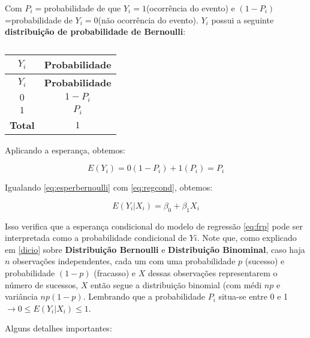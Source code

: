 \documentclass[
]{book}
\begin{document}
Com \(P_i=\)probabilidade de que \(Y_i=1\)(ocorrência do evento) e \((1-P_i)\)=probabilidade de \(Y_i=0\)(não ocorrência do evento). \(Y_i\) possui a seguinte \textbf{distribuição de probabilidade de Bernoulli}:

\begin{longtable}[]{@{}cc@{}}
\caption{\label{tab:bernoulireg}}\tabularnewline
\toprule
\textbf{\(Y_i\)} & \textbf{Probabilidade}\tabularnewline
\midrule
\endfirsthead
\toprule
\textbf{\(Y_i\)} & \textbf{Probabilidade}\tabularnewline
\midrule
\endhead
\(0\) & \(1-P_i\)\tabularnewline
\(1\) & \(P_i\)\tabularnewline
\textbf{Total} & \(1\)\tabularnewline
\bottomrule
\end{longtable}

Aplicando a esperança, obtemos:

\begin{equation}
    E(Y_i)=0(1-P_i)+1(P_i)=P_i
    \label{eq:esperbernoulli}
\end{equation}

Igualando \eqref{eq:esperbernoulli} com \eqref{eq:regcond}, obtemos:

\begin{equation}
    E(Y_i|X_i)=\beta_0+\beta_1 X_i
    \label{eq:regprob}
\end{equation}

Isso verifica que a esperança condicional do modelo de regressão \eqref{eq:frp} pode ser interpretada como a probabilidade
condicional de \(Yi\). Note que, como explicado em \ref{dicio} sobre \textbf{Distribuição Bernoulli} e \textbf{Distribuição Binominal}, caso haja \(n\) observações independentes, cada um com uma probabilidade \(p\) (sucesso) e probabilidade \((1 - p)\) (fracasso) e \(X\) dessas observações representarem o número de sucessos, \(X\) então segue a distribuição binomial (com médi \(np\) e variância \(np(1-p)\). Lembrando que a probabilidade \(P_i\) situa-se entre 0 e 1 \(\rightarrow 0 \leq E(Y_i|X_i) \leq 1\).

Alguns detalhes importantes:
\end{document}
